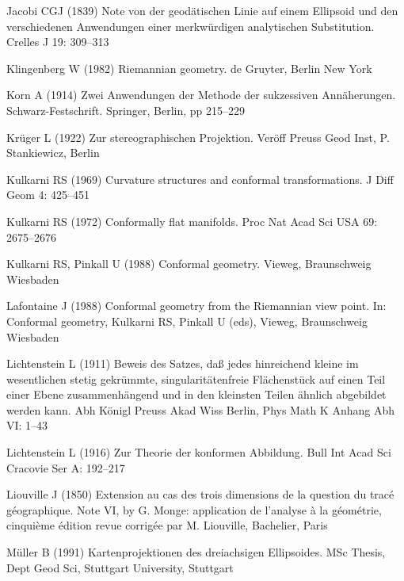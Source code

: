 \documentclass[jog]{svjour}
\begin{document}
\begin{thebibliography}{}
 Jacobi CGJ (1839) Note von der
geod\"{a}tischen Linie auf einem Ellipsoid und den verschiedenen
Anwendungen einer merkw\"{u}rdigen analytischen Substitution. Crelles J
19: 309--313

 Klingenberg W (1982) Riemannian
geometry. de Gruyter, Berlin New York

 Korn A (1914) Zwei Anwendungen der Methode
der sukzessiven Ann\"{a}herungen. Schwarz-Festschrift. Springer, Berlin,
pp 215--229

 Kr\"{u}ger L (1922) Zur
stereographischen Projektion. Ver\"{o}ff Preuss Geod Inst, P.
Stankiewicz, Berlin

 Kulkarni RS (1969) Curvature structures
and conformal transformations. J Diff Geom 4: 425--451

 Kulkarni RS (1972) Conformally flat
manifolds. Proc Nat Acad Sci USA 69: 2675--2676

 Kulkarni RS, Pinkall U
(1988) Conformal geometry. Vieweg, Braunschweig Wiesbaden

 Lafontaine J (1988) Conformal geometry
from the Riemannian view point. In: Conformal geometry, Kulkarni RS,
Pinkall U (eds), Vieweg, Braunschweig Wiesbaden

 Lichtenstein L (1911) Beweis des
Satzes, da{\ss} jedes hinreichend kleine im wesentlichen stetig
gekr\"{u}mmte, singularit\"{a}tenfreie Fl\"{a}chenst\"{u}ck auf einen
Teil einer Ebene zusammenh\"{a}ngend und in den kleinsten Teilen
\"{a}hnlich abgebildet werden kann. Abh K\"{o}nigl Preuss Akad Wiss
Berlin, Phys Math K Anhang Abh VI: 1--43

 Lichtenstein L (1916) Zur Theorie der
konformen Abbildung. Bull Int Acad Sci Cracovie Ser A: 192--217

 Liouville J (1850) Extension au cas des
trois dimensions de la question du trac\'{e} g\'{e}ographique. Note VI,
by G. Monge: application de l'analyse \`{a} la g\'{e}om\'{e}trie,
cinqui\`{e}me \'{e}dition revue corrig\'{e}e par M. Liouville,
Bachelier, Paris

 M\"{u}ller B (1991) Kartenprojektionen
des dreiachsigen Ellipsoides. MSc Thesis, Dept Geod Sci, Stuttgart
University, Stuttgart


\end{thebibliography}
\end{document}

